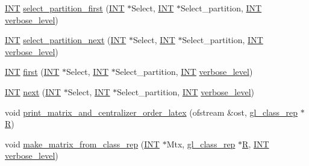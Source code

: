 \begin{DoxyCompactItemize}
\item 
\mbox{\hyperlink{galois_8h_a09fddde158a3a20bd2dcadb609de11dc}{I\+NT}} \mbox{\hyperlink{classgl__classes_a511118c4aa43095abc3c4e903cdca973}{select\+\_\+partition\+\_\+first}} (\mbox{\hyperlink{galois_8h_a09fddde158a3a20bd2dcadb609de11dc}{I\+NT}} $\ast$Select, \mbox{\hyperlink{galois_8h_a09fddde158a3a20bd2dcadb609de11dc}{I\+NT}} $\ast$Select\+\_\+partition, \mbox{\hyperlink{galois_8h_a09fddde158a3a20bd2dcadb609de11dc}{I\+NT}} \mbox{\hyperlink{simeon_8_c_a818073fbcc2f439e7c56952f67386122}{verbose\+\_\+level}})
\item 
\mbox{\hyperlink{galois_8h_a09fddde158a3a20bd2dcadb609de11dc}{I\+NT}} \mbox{\hyperlink{classgl__classes_a5c5dd7feacc31e5d5fef2f68e11ccaaf}{select\+\_\+partition\+\_\+next}} (\mbox{\hyperlink{galois_8h_a09fddde158a3a20bd2dcadb609de11dc}{I\+NT}} $\ast$Select, \mbox{\hyperlink{galois_8h_a09fddde158a3a20bd2dcadb609de11dc}{I\+NT}} $\ast$Select\+\_\+partition, \mbox{\hyperlink{galois_8h_a09fddde158a3a20bd2dcadb609de11dc}{I\+NT}} \mbox{\hyperlink{simeon_8_c_a818073fbcc2f439e7c56952f67386122}{verbose\+\_\+level}})
\item 
\mbox{\hyperlink{galois_8h_a09fddde158a3a20bd2dcadb609de11dc}{I\+NT}} \mbox{\hyperlink{classgl__classes_a7b99865b055cd459426c45fe231cfb69}{first}} (\mbox{\hyperlink{galois_8h_a09fddde158a3a20bd2dcadb609de11dc}{I\+NT}} $\ast$Select, \mbox{\hyperlink{galois_8h_a09fddde158a3a20bd2dcadb609de11dc}{I\+NT}} $\ast$Select\+\_\+partition, \mbox{\hyperlink{galois_8h_a09fddde158a3a20bd2dcadb609de11dc}{I\+NT}} \mbox{\hyperlink{simeon_8_c_a818073fbcc2f439e7c56952f67386122}{verbose\+\_\+level}})
\item 
\mbox{\hyperlink{galois_8h_a09fddde158a3a20bd2dcadb609de11dc}{I\+NT}} \mbox{\hyperlink{classgl__classes_a46bfab85f702dcb50eaecdd7c43fba35}{next}} (\mbox{\hyperlink{galois_8h_a09fddde158a3a20bd2dcadb609de11dc}{I\+NT}} $\ast$Select, \mbox{\hyperlink{galois_8h_a09fddde158a3a20bd2dcadb609de11dc}{I\+NT}} $\ast$Select\+\_\+partition, \mbox{\hyperlink{galois_8h_a09fddde158a3a20bd2dcadb609de11dc}{I\+NT}} \mbox{\hyperlink{simeon_8_c_a818073fbcc2f439e7c56952f67386122}{verbose\+\_\+level}})
\item 
void \mbox{\hyperlink{classgl__classes_ace5b5c0cd93656922837cef33fbf5e20}{print\+\_\+matrix\+\_\+and\+\_\+centralizer\+\_\+order\+\_\+latex}} (ofstream \&ost, \mbox{\hyperlink{classgl__class__rep}{gl\+\_\+class\+\_\+rep}} $\ast$\mbox{\hyperlink{pentomino__5x5_8_c_a9e6c5a8291295bd0292db81cc90cb2cf}{R}})
\item 
void \mbox{\hyperlink{classgl__classes_a116d52ea110596476a2386bc58f88899}{make\+\_\+matrix\+\_\+from\+\_\+class\+\_\+rep}} (\mbox{\hyperlink{galois_8h_a09fddde158a3a20bd2dcadb609de11dc}{I\+NT}} $\ast$Mtx, \mbox{\hyperlink{classgl__class__rep}{gl\+\_\+class\+\_\+rep}} $\ast$\mbox{\hyperlink{pentomino__5x5_8_c_a9e6c5a8291295bd0292db81cc90cb2cf}{R}}, \mbox{\hyperlink{galois_8h_a09fddde158a3a20bd2dcadb609de11dc}{I\+NT}} \mbox{\hyperlink{simeon_8_c_a818073fbcc2f439e7c56952f67386122}{verbose\+\_\+level}})

\end{DoxyCompactItemize}
